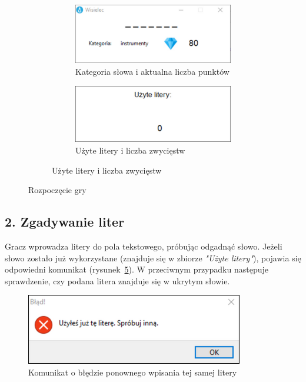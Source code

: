 \documentclass[]{report}
\begin{document}
\begin{figure}[h]
\begin{subfigure}{0.4\textwidth}
\begin{subfigure}{0.4\textheight}
			\centering
			\includegraphics[width=0.8\linewidth]{2}
			\caption{Kategoria słowa i aktualna liczba punktów}
			\label{fig:kategoria_punkty}
			\vspace{2cm}
		\end{subfigure}
		\vspace{2cm} %
		\begin{subfigure}{0.4\textheight}
			\centering
			\includegraphics[width=0.8\linewidth]{3}
			\caption{Użyte litery i liczba zwycięstw}
			\label{fig:uzyte_slowa_zywciestwa}
		\end{subfigure}
	\end{subfigure}
	\caption{Rozpoczęcie gry}
	\label{fig:Interface_menu}
\end{figure}

\subsection*{2. Zgadywanie liter}

Gracz wprowadza litery do pola tekstowego, próbując odgadnąć słowo. Jeżeli słowo zostało już wykorzystane (znajduje się w zbiorze \textit{"Użyte litery"}), pojawia się odpowiedni komunikat (rysunek~\ref{fig:litera_uzyta}). W przeciwnym przypadku następuje sprawdzenie, czy podana litera znajduje się w ukrytym słowie.

\vspace{0.5cm} %

\begin{figure}[h]
	\centering
	\includegraphics[width=0.6\linewidth]{uzyta_litera}
	\caption{Komunikat o błędzie ponownego wpisania tej samej litery}
	\label{fig:litera_uzyta}
\end{figure}
\end{document}
